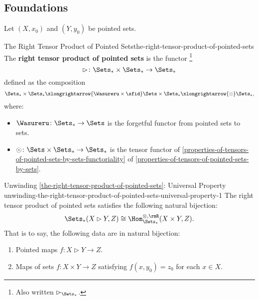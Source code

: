 \subsection{Foundations}\label{subsection-the-right-tensor-product-of-pointed-sets-foundations}
Let $(X,x_{0})$ and $(Y,y_{0})$ be pointed sets.
\begin{definition}{The Right Tensor Product of Pointed Sets}{the-right-tensor-product-of-pointed-sets}%
    The \textbf{right tensor product of pointed sets} is the functor%
    \footnote{%
        Also written $\rhd_{\Sets_{*}}$.
        \par\vspace*{\TCBBoxCorrection}
    }%
    \[
        \rhd%
        \colon%
        \Sets_{*}\times\Sets_{*}%
        \to%
        \Sets_{*}%
    \]%
    defined as the composition
    \[
        \Sets_{*}\times\Sets_{*}%
        \xlongrightarrow{\Wasureru\times\sfid}%
        \Sets\times\Sets_{*}%
        \xlongrightarrow{\odot}%
        \Sets_{*},%
    \]%
    where:
    \begin{itemize}
        \item $\Wasureru\colon\Sets_{*}\to\Sets$ is the forgetful functor from pointed sets to sets.
        \item $\odot\colon\Sets\times\Sets_{*}\to\Sets_{*}$ is the tensor functor of \cref{properties-of-tensors-of-pointed-sets-by-sets-functoriality} of \cref{properties-of-tensors-of-pointed-sets-by-sets}.%
    \end{itemize}
\end{definition}
\begin{remark}{Unwinding \cref{the-right-tensor-product-of-pointed-sets}: Universal Property \rmI}{unwinding-the-right-tensor-product-of-pointed-sets-universal-property-1}%
    The right tensor product of pointed sets satisfies the following natural bijection:%
    \[%
        \Sets_{*}(X\rhd Y,Z)%
        \cong%
        \Hom^{\otimes,\rmR}_{\Sets_{*}}(X\times Y,Z).
    \]%
    That is to say, the following data are in natural bijection:
    \begin{enumerate}
        \item\label{unwinding-the-right-tensor-product-of-pointed-sets-universal-property-1-item-1}Pointed maps $f\colon X\rhd Y\to Z$.
        \item\label{unwinding-the-right-tensor-product-of-pointed-sets-universal-property-1-item-2}Maps of sets $f\colon X\times Y\to Z$ satisfying $f(x,y_{0})=z_{0}$ for each $x\in X$.
    \end{enumerate}
\end{remark}
